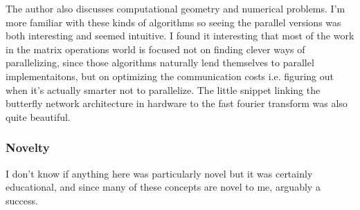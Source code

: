 The author also discusses computational geometry and numerical problems. I'm more familiar with these kinds of algorithms so seeing the parallel versions was both interesting and seemed intuitive. I found it interesting that most of the work in the matrix operations world is focused not on finding clever ways of parallelizing, since those algorithms naturally lend themselves to parallel implementaitons, but on optimizing the communication costs i.e. figuring out when it's actually smarter not to parallelize. The little snippet linking the butterfly network architecture in hardware to the fast fourier transform was also quite beautiful. 

\subsubsection{Novelty}

I don't know if anything here was particularly novel but it was certainly educational, and since many of these concepts are novel to me, arguably a success.